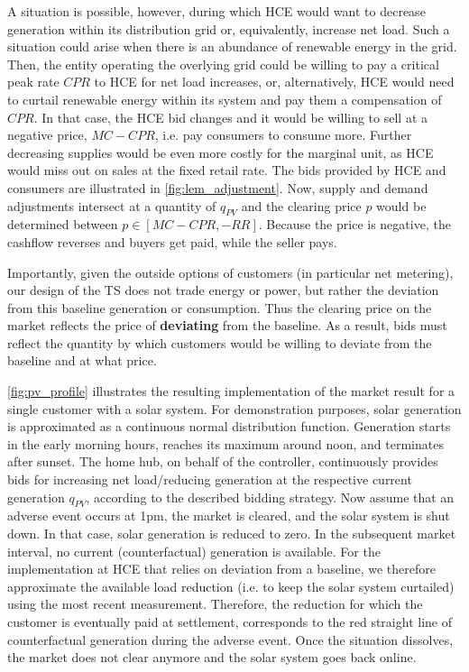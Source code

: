A situation is possible, however, during which HCE would want to decrease generation within its distribution grid or, equivalently, increase net load. Such a situation could arise when there is an abundance of renewable energy in the grid. Then, the entity operating the overlying grid could be willing to pay a critical peak rate $CPR$ to HCE for net load increases, or, alternatively, HCE would need to curtail renewable energy within its system and pay them a compensation of $CPR$. In that case, the HCE bid changes and it would be willing to sell at a negative price, $MC - CPR$, i.e. pay consumers to consume more. Further decreasing supplies would be even more costly for the marginal unit, as HCE would miss out on sales at the fixed retail rate. 
The bids provided by HCE and consumers are illustrated in \cref{fig:lem_adjustment}. Now, supply and demand adjustments intersect at a quantity of $q_{PV}$ and the clearing price $p$ would be determined between $p \in [MC - CPR, -RR]$. Because the price is negative, the cashflow reverses and buyers get paid, while the seller pays.

Importantly, given the outside options of customers (in particular net metering), our design of the TS does not trade energy or power, but rather the deviation from this baseline generation or consumption. Thus the clearing price on the market reflects the price of \textbf{deviating} from the baseline. As a result, bids must reflect the quantity by which customers would be willing to deviate from the baseline and at what price. 

\cref{fig:pv_profile} illustrates the resulting implementation of the market result for a single customer with a solar system. For demonstration purposes, solar generation is approximated as a continuous normal distribution function. Generation starts in the early morning hours, reaches its maximum around noon, and terminates after sunset. The home hub, on behalf of the controller, continuously provides bids for increasing net load/reducing generation at the respective current generation $q_{PV}$, according to the described bidding strategy. Now assume that an adverse event occurs at 1pm, the market is cleared, and the solar system is shut down. In that case, solar generation is reduced to zero. In the subsequent market interval, no current (counterfactual) generation is available. For the implementation at HCE that relies on deviation from a baseline, we therefore approximate the available load reduction (i.e. to keep the solar system curtailed) using the most recent measurement. Therefore, the reduction for which the customer is eventually paid at settlement, corresponds to the red straight line of counterfactual generation during the adverse event. Once the situation dissolves, the market does not clear anymore and the solar system goes back online.

